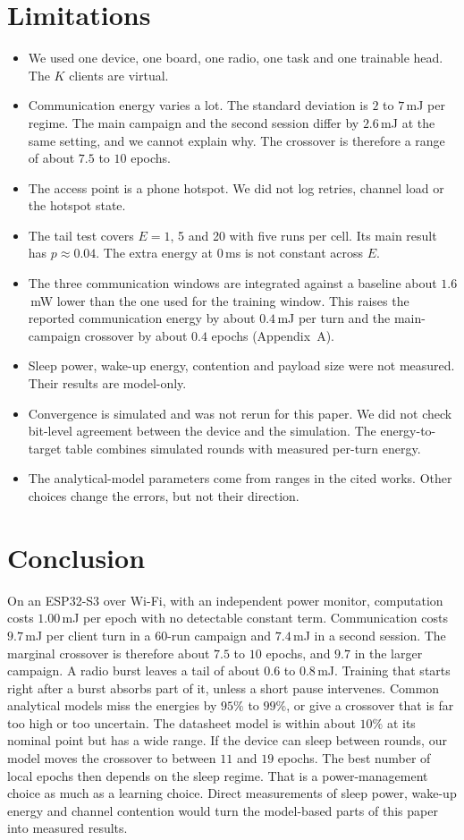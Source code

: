 \documentclass[journal]{IEEEtran}
\begin{document}
\section{Limitations}
\label{sec:limits}
\begin{itemize}
\item We used one device, one board, one radio, one task and one trainable head. The $K$ clients are virtual.
\item Communication energy varies a lot. The standard deviation is $2$ to $7$\,mJ per regime. The main campaign and the second session differ by $2.6$\,mJ at the same setting, and we cannot explain why. The crossover is therefore a range of about $7.5$ to $10$ epochs.
\item The access point is a phone hotspot. We did not log retries, channel load or the hotspot state.
\item The tail test covers $E=1$, 5 and 20 with five runs per cell. Its main result has $p\approx0.04$. The extra energy at $0$\,ms is not constant across $E$.
\item The three communication windows are integrated against a baseline about $1.6$\,mW lower than the one used for the training window. This raises the reported communication energy by about $0.4$\,mJ per turn and the main-campaign crossover by about $0.4$ epochs (Appendix~A).
\item Sleep power, wake-up energy, contention and payload size were not measured. Their results are model-only.
\item Convergence is simulated and was not rerun for this paper. We did not check bit-level agreement between the device and the simulation. The energy-to-target table combines simulated rounds with measured per-turn energy.
\item The analytical-model parameters come from ranges in the cited works. Other choices change the errors, but not their direction.
\end{itemize}

\section{Conclusion}
On an ESP32-S3 over Wi-Fi, with an independent power monitor, computation costs $1.00$\,mJ per epoch with no detectable constant term. Communication costs $9.7$\,mJ per client turn in a 60-run campaign and $7.4$\,mJ in a second session. The marginal crossover is therefore about $7.5$ to $10$ epochs, and $9.7$ in the larger campaign. A radio burst leaves a tail of about $0.6$ to $0.8$\,mJ. Training that starts right after a burst absorbs part of it, unless a short pause intervenes. Common analytical models miss the energies by $95\%$ to $99\%$, or give a crossover that is far too high or too uncertain. The datasheet model is within about $10\%$ at its nominal point but has a wide range. If the device can sleep between rounds, our model moves the crossover to between $11$ and $19$ epochs. The best number of local epochs then depends on the sleep regime. That is a power-management choice as much as a learning choice. Direct measurements of sleep power, wake-up energy and channel contention would turn the model-based parts of this paper into measured results.
\end{document}
